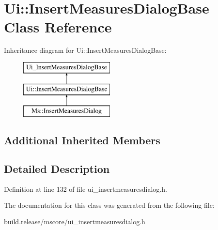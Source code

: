 \hypertarget{class_ui_1_1_insert_measures_dialog_base}{}\section{Ui\+:\+:Insert\+Measures\+Dialog\+Base Class Reference}
\label{class_ui_1_1_insert_measures_dialog_base}
Inheritance diagram for Ui\+:\+:Insert\+Measures\+Dialog\+Base\+:\begin{figure}[H]
\begin{center}
\leavevmode
\includegraphics[height=3.000000cm]{class_ui_1_1_insert_measures_dialog_base}
\end{center}
\end{figure}
\subsection*{Additional Inherited Members}


\subsection{Detailed Description}


Definition at line 132 of file ui\+\_\+insertmeasuresdialog.\+h.



The documentation for this class was generated from the following file\+:\begin{DoxyCompactItemize}
\item 
build.\+release/mscore/ui\+\_\+insertmeasuresdialog.\+h\end{DoxyCompactItemize}
